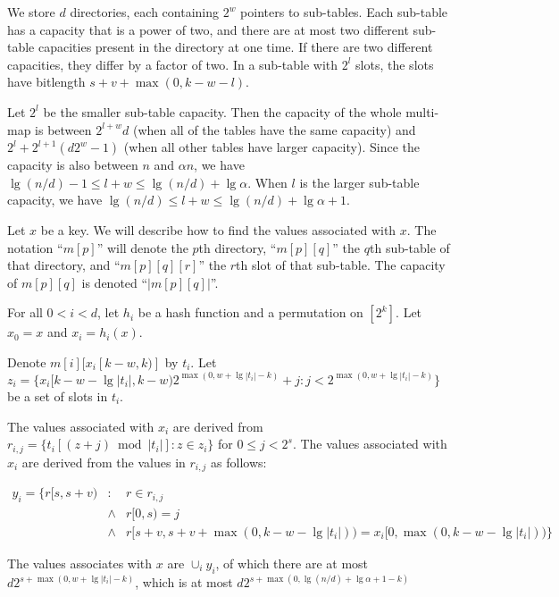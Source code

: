 \documentclass[11pt,letterpaper]{article}
\begin{document}
We store $d$ directories, each containing $2^w$ pointers to sub-tables.
Each sub-table has a capacity that is a power of two, and there are at most two different sub-table capacities present in the directory at one time.
If there are two different capacities, they differ by a factor of two.
In a sub-table with $2^l$ slots, the slots have bitlength $s + v + \max(0,k - w - l)$.

Let $2^l$ be the smaller sub-table capacity.
Then the capacity of the whole multi-map is between $2^{l+w}d$ (when all of the tables have the same capacity) and $2^l + 2^{l+1}(d 2^w - 1)$ (when all other tables have larger capacity).
Since the capacity is also between $n$ and $\alpha n$, we have $\lg (n/d) - 1 \leq l + w \leq \lg(n/d) + \lg \alpha$.
When $l$ is the larger sub-table capacity, we have $\lg (n/d) \leq l + w \leq \lg (n/d) + \lg \alpha + 1$.

Let $x$ be a key.
We will describe how to find the values associated with $x$.
The notation ``$m[p]$'' will denote the $p$th directory, ``$m[p][q]$'' the $q$th sub-table of that directory, and ``$m[p][q][r]$'' the $r$th slot of that sub-table.
The capacity of $m[p][q]$ is denoted ``$|m[p][q]|$''.

For all $0 < i < d$, let $h_i$ be a hash function and a permutation on $[2^k]$.
Let $x_0 = x$ and $x_i = h_i(x)$.

Denote $m[i][x_i[k-w,k)]$ by $t_i$.
Let $z_i = \{x_i[k - w - \lg |t_i|, k - w) 2^{\max(0,w + \lg |t_i| - k)} + j : j < 2^{\max(0,w + \lg |t_i| - k)}\}$ be a set of slots in $t_i$.

The values associated with $x_i$ are derived from $r_{i,j} = \{t_i[(z  + j) \bmod |t_i|] : z \in z_i\}$ for $0 \leq j < 2^s$.
The values associated with $x_i$ are derived from the values in $r_{i,j}$ as follows:

\begin{displaymath}
  \begin{array}{llll}
    y_i = \{r[s, s+v) & : & r \in r_{i,j} & \qquad \\
      &    \land & r[0,s) = j & \\
        &  \land & r[s+v,s + v + \max(0,k - w - \lg |t_i|)) = x_i[0, \max(0,k - w - \lg |t_i|))\} &
  \end{array}
\end{displaymath}

The values associates with $x$ are $\cup_i y_i$, of which there are at most $d2^{s + \max(0,w + \lg |t_i| - k)}$, which is at most  $d2^{s + \max(0,\lg(n/d) + \lg \alpha + 1 - k)}$
\end{document}
